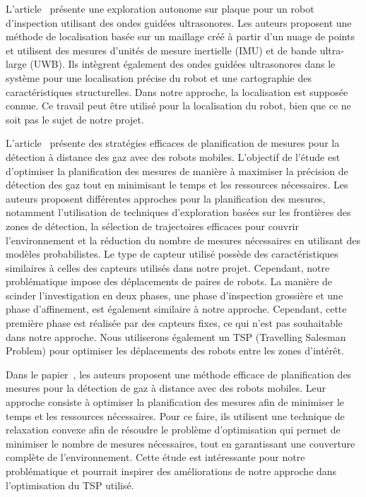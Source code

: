 \documentclass[francais,RandD]{rapportPFE}
\begin{document}
		L'article~\cite{9568841} présente une exploration autonome sur plaque pour un robot d'inspection utilisant des ondes guidées ultrasonores.
		Les auteurs proposent une méthode de localisation basée sur un maillage créé à partir d'un nuage de points et utilisent des mesures d'unités de mesure inertielle (IMU) et de bande ultra-large (UWB).
		Ils intègrent également des ondes guidées ultrasonores dans le système pour une localisation précise du robot et une cartographie des caractéristiques structurelles.
		Dans notre approche, la localisation est supposée connue.
		Ce travail peut être utilisé pour la localisation du robot, bien que ce ne soit pas le sujet de notre projet.

		L'article~\cite{7487624} présente des stratégies efficaces de planification de mesures pour la détection à distance des gaz avec des robots mobiles.
		L'objectif de l'étude est d'optimiser la planification des mesures de manière à maximiser la précision de détection des gaz tout en minimisant le temps et les ressources nécessaires.
		Les auteurs proposent différentes approches pour la planification des mesures, notamment l'utilisation de techniques d'exploration basées sur les frontières des zones de détection, la sélection de trajectoires efficaces pour couvrir l'environnement et la réduction du nombre de mesures nécessaires en utilisant des modèles probabilistes.
		Le type de capteur utilisé possède des caractéristiques similaires à celles des capteurs utilisés dans notre projet.
		Cependant, notre problématique impose des déplacements de paires de robots.
		La manière de scinder l'investigation en deux phases, une phase d'inspection grossière et une phase d'affinement, est également similaire à notre approche.
		Cependant, cette première phase est réalisée par des capteurs fixes, ce qui n'est pas souhaitable dans notre approche.
		Nous utiliserons également un TSP (Travelling Salesman Problem) pour optimiser les déplacements des robots entre les zones d'intérêt.

		Dans le papier~\cite{7139673}, les auteurs proposent une méthode efficace de planification des mesures pour la détection de gaz à distance avec des robots mobiles.
		Leur approche consiste à optimiser la planification des mesures afin de minimiser le temps et les ressources nécessaires.
		Pour ce faire, ils utilisent une technique de relaxation convexe afin de résoudre le problème d'optimisation qui permet de minimiser le nombre de mesures nécessaires, tout en garantissant une couverture complète de l'environnement.
		Cette étude est intéressante pour notre problématique et pourrait inspirer des améliorations de notre approche dans l'optimisation du TSP utilisé.
\end{document}
